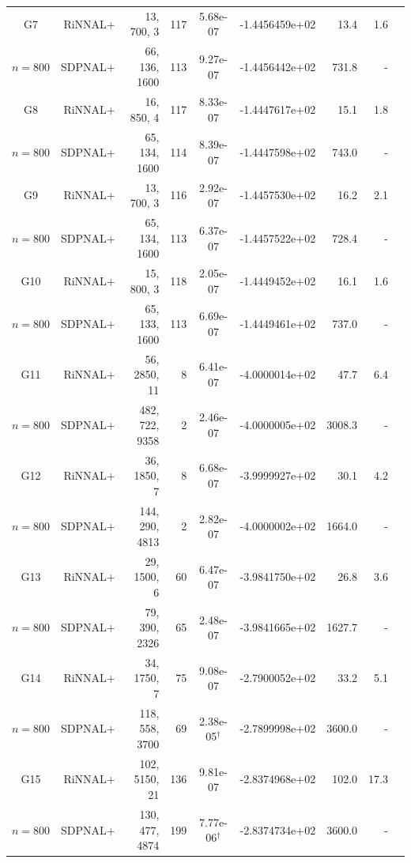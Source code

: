 \documentclass[11pt]{article}
\theoremstyle{plain}
\begin{document}
\begin{footnotesize}
\begin{longtable}[c]{crrrccrrr}
G7& RiNNAL+ & 13, 700, 3 & 117 & 5.68e-07 & -1.4456459e+02 & 13.4 &1.6 \\ 
$n=800$ & SDPNAL+ & 66, 136, 1600 & 113& 9.27e-07 & -1.4456442e+02 & 731.8 & - \\ [3pt] 

G8& RiNNAL+ & 16, 850, 4 & 117 & 8.33e-07 & -1.4447617e+02 & 15.1 &1.8 \\ 
$n=800$ & SDPNAL+ & 65, 134, 1600 & 114& 8.39e-07 & -1.4447598e+02 & 743.0 & - \\ [3pt] 

G9& RiNNAL+ & 13, 700, 3 & 116 & 2.92e-07 & -1.4457530e+02 & 16.2 &2.1 \\ 
$n=800$ & SDPNAL+ & 65, 134, 1600 & 113& 6.37e-07 & -1.4457522e+02 & 728.4 & - \\ [3pt] 

G10& RiNNAL+ & 15, 800, 3 & 118 & 2.05e-07 & -1.4449452e+02 & 16.1 &1.6 \\ 
$n=800$ & SDPNAL+ & 65, 133, 1600 & 113& 6.69e-07 & -1.4449461e+02 & 737.0 & - \\ [3pt] 

G11& RiNNAL+ & 56, 2850, 11 & 8 & 6.41e-07 & -4.0000014e+02 & 47.7 &6.4 \\ 
$n=800$ & SDPNAL+ & 482, 722, 9358 & 2& 2.46e-07 & -4.0000005e+02 & 3008.3 & - \\ [3pt] 

G12& RiNNAL+ & 36, 1850, 7 & 8 & 6.68e-07 & -3.9999927e+02 & 30.1 &4.2 \\ 
$n=800$ & SDPNAL+ & 144, 290, 4813 & 2& 2.82e-07 & -4.0000002e+02 & 1664.0 & - \\ [3pt] 

G13& RiNNAL+ & 29, 1500, 6 & 60 & 6.47e-07 & -3.9841750e+02 & 26.8 &3.6 \\ 
$n=800$ & SDPNAL+ & 79, 390, 2326 & 65& 2.48e-07 & -3.9841665e+02 & 1627.7 & - \\ [3pt] 

G14& RiNNAL+ & 34, 1750, 7 & 75 & 9.08e-07 & -2.7900052e+02 & 33.2 &5.1 \\ 
$n=800$ & SDPNAL+ & 118, 558, 3700 & 69& 2.38e-05$^{\dagger}$ & -2.7899998e+02 & 3600.0 & - \\ [3pt] 

G15& RiNNAL+ & 102, 5150, 21 & 136 & 9.81e-07 & -2.8374968e+02 & 102.0 &17.3 \\ 
$n=800$ & SDPNAL+ & 130, 477, 4874 & 199& 7.77e-06$^{\dagger}$ & -2.8374734e+02 & 3600.0 & - \\ [3pt] 


\end{longtable}
\end{footnotesize}
\end{document}
